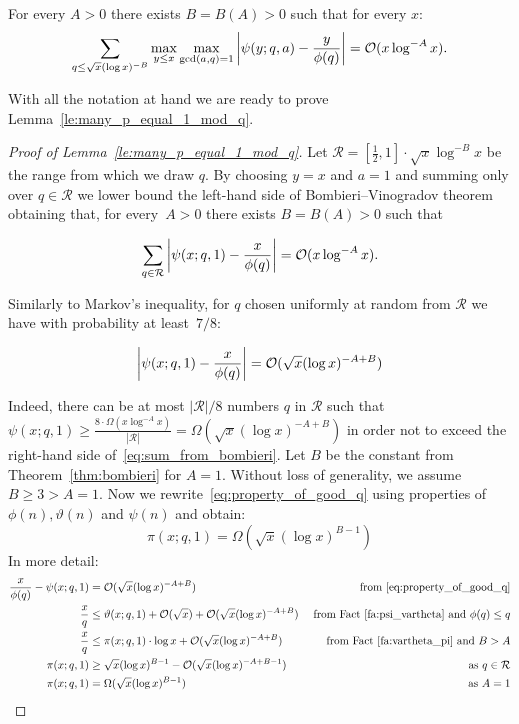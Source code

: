 \begin{thm}\label{thm:bombieri}
For every $A>0$ there exists $B=B(A)>0$ such that for every $x$:
\[
\sum_{q\leq \sqrt{x}(\log x)^{-B}} \max_{y\leq x}\max_{\gcd(a,q)=1} \left| \psi(y;q,a) - \frac{y}{\phi(q)}\right| = \mathcal{O}(x\log^{-A} x). 
\]
\end{thm}
\noindent
With all the notation at hand we are ready to prove Lemma~\ref{le:many_p_equal_1_mod_q}.

\begin{proof}[Proof of Lemma~\ref{le:many_p_equal_1_mod_q}]

Let $\mathcal{R}=[\frac12,1]\cdot \sqrt{x}\log^{-B} x$ be the range from which we draw $q$.
By choosing $y=x$ and $a=1$ and summing only over $q\in\mathcal{R}$ we lower bound the left-hand side of Bombieri--Vinogradov theorem obtaining that, for every~$A>0$ there exists $B=B(A)>0$ such that 

\begin{equation}\label{eq:sum_from_bombieri}
\sum_{q \in \mathcal{R}} \left| \psi(x;q,1) - \frac{x}{\phi(q)}\right| = \mathcal{O}(x\log^{-A} x).  
\end{equation}


\noindent Similarly to Markov's inequality, for $q$ chosen uniformly at random from $\mathcal{R}$ we have with probability at least~$7/8$:

\begin{equation}\label{eq:property_of_good_q}
\left| \psi(x;q,1) - \frac{x}{\phi(q)}\right| = \mathcal{O}(\sqrt{x}(\log x)^{-A+B}) 
\end{equation}

Indeed, there can be at most $|\mathcal{R}|/8$ numbers $q$ in $\mathcal{R}$ such that $\psi(x;q,1)\geq \frac{8\cdot\Omega(x\log^{-A} x)}{|\mathcal{R}|}=\Omega(\sqrt{x}(\log x)^{-A+B})$ in order not to exceed the right-hand side of~\eqref{eq:sum_from_bombieri}.
Let $B$ be the constant from Theorem~\ref{thm:bombieri} for $A=1$. 
Without loss of generality, we assume $B\geq 3>A=1$.
Now we rewrite~\eqref{eq:property_of_good_q} using properties of $\phi(n),\vartheta(n)$ and $\psi(n)$ and obtain:
\[
\pi(x;q,1) = \Omega(\sqrt{x}(\log x)^{B-1})
\]
In more detail:
\begin{align*}
 \frac{x}{\phi(q)} - \psi(x;q,1) &= \mathcal{O}(\sqrt x (\log x)^{-A+B}) & \text{ from~\eqref{eq:property_of_good_q}} \\
 \frac xq & \le \vartheta(x;q,1) + \mathcal{O}(\sqrt x) + \mathcal{O}(\sqrt x (\log x)^{-A+B}) & \text{ from Fact~\ref{fa:psi_vartheta} and }\phi(q)\leq q \\
 \frac xq & \le \pi(x;q,1)\cdot\log x + \mathcal{O}(\sqrt x (\log x)^{-A+B}) & \text{from Fact \ref{fa:vartheta_pi} and } B > A \\
 \pi(x;q,1) & \ge  \sqrt x (\log x)^{B-1}  - \mathcal{O}(\sqrt x (\log x)^{-A+B-1}) & \text{ as } q\in\mathcal{R} \\
 \pi(x;q,1) &= \Omega(\sqrt{x}(\log x)^{B-1}) & \text{ as } A=1 \\
\end{align*}
\end{proof}

